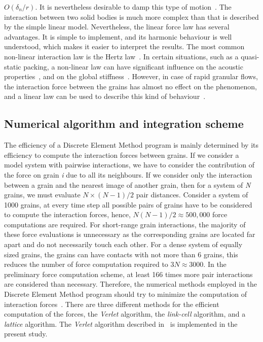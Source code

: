 $\mathbf{\mathit{O}}(\delta_{n}/r)$. It is nevertheless desirable to damp this 
type of 
motion~\citep{Radjai2011}. 
The interaction between two solid bodies is much more complex than that is 
described by the simple 
linear model. Nevertheless, the linear force law has several advantages. It is 
simple to 
implement, 
and its harmonic behaviour is well understood, which makes it easier to 
interpret the results. The 
most common non-linear interaction law is the Hertz law~\citep{Hertz1882}. In 
certain situations, 
such as a quasi-static packing, a non-linear law can have significant influence 
on the acoustic 
properties~\citep{Tou2004}, and on the global stiffness~\citep{Agn2007}. 
However, in case of rapid 
granular flows, the interaction force between the grains has almost no 
effect on the 
phenomenon, 
and a linear law can be used to describe this kind of 
behaviour~\citep{Radjai2011}. 
% 
%
\subsection{Numerical algorithm and integration scheme}
The efficiency of a Discrete Element Method program is mainly determined by 
its efficiency to compute the interaction forces between grains. If we 
consider a model system with pairwise interactions, we have to consider the 
contribution of the force on grain \textit{i} due to all its 
neighbours. If we consider only the interaction between a grain and the 
nearest image of another grain, then for a system of \textit{N} grains, 
we must evaluate $N \times (N-1)/2$ pair distances. Consider a system of 1000 
grains, at every time step all possible pairs of grains have to be 
considered to compute the interaction forces, hence, 
$\mathit{N}(\mathit{N}-1)/2 \approx 500,000$ 
force computations are required. For short-range grain interactions, the 
majority of these force evaluations is unnecessary as the corresponding 
grains are located far apart and do not necessarily touch each other. For a 
dense system of equally sized grains, the grains can have 
contacts with not more than 6 grains, this reduces the number of force 
computation required to $3\mathit{N} \approx 3000$. In the preliminary force 
computation scheme, at least 166 times more pair interactions are considered 
than necessary. Therefore, the numerical methods employed in the 
Discrete Element Method program should try to minimize the computation of 
interaction forces~\citep{Posch2005}. There are three different methods for the 
efficient computation of the forces, the \textit{Verlet} algorithm, the 
\textit{link-cell} algorithm, and a \textit{lattice} algorithm. The 
\textit{Verlet} algorithm described in~\citet{Grubmuller1991} 
is implemented in the 
present study.
\clearpage
